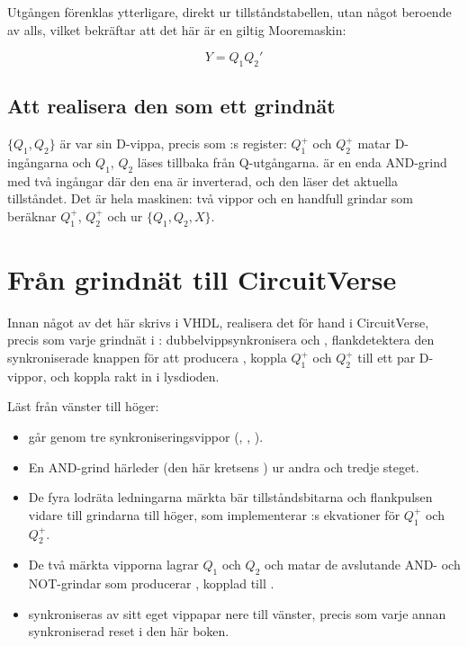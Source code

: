 Utgången  förenklas ytterligare, direkt ur tillståndstabellen, utan något beroende av
 alls, vilket bekräftar att det här är en giltig Mooremaskin:

\[ Y = Q_1 Q_2' \]

\subsection*{Att realisera den som ett grindnät}
$\{Q_1, Q_2\}$ är var sin D-vippa, precis som :s register: $Q_1^{+}$ och $Q_2^{+}$
matar D-ingångarna och $Q_1$, $Q_2$ läses tillbaka från Q-utgångarna.  är en enda AND-grind
med två ingångar där den ena är inverterad, och den läser det aktuella tillståndet. Det är hela
maskinen: två vippor och en handfull grindar som beräknar $Q_1^{+}$, $Q_2^{+}$ och  ur
$\{Q_1, Q_2, X\}$.

\section{Från grindnät till CircuitVerse}
\label{c8:sec:cv}

Innan något av det här skrivs i VHDL, realisera det för hand i CircuitVerse, precis som varje
grindnät i : dubbelvippsynkronisera  och ,
flankdetektera den synkroniserade knappen för att producera , koppla $Q_1^{+}$ och
$Q_2^{+}$ till ett par D-vippor, och koppla  rakt in i lysdioden.


Läst från vänster till höger:
\begin{itemize}
  \item {} går genom tre synkroniseringsvippor
    (, , ).
  \item En AND-grind härleder  (den här kretsens ) ur andra och tredje
    steget.
  \item De fyra lodräta ledningarna märkta  bär tillståndsbitarna och flankpulsen
    vidare till grindarna till höger, som implementerar :s ekvationer för
    $Q_1^{+}$ och $Q_2^{+}$.
  \item De två märkta vipporna lagrar $Q_1$ och $Q_2$ och matar de avslutande AND- och NOT-grindar
    som producerar , kopplad till .
  \item {} synkroniseras av sitt eget vippapar nere till vänster, precis som varje annan
    synkroniserad reset i den här boken.
\end{itemize}

